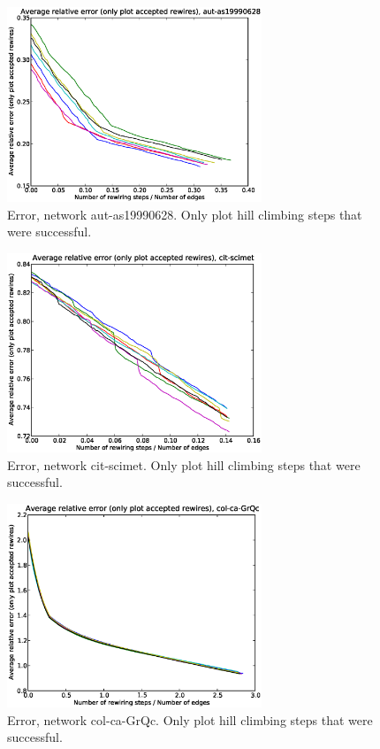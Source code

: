 \begin{figure}[p]
\centering
\includegraphics[width=3in]{Figures/acceptedOnly-aut-as19990628.eps}
\caption{Error, network aut-as19990628.  Only plot hill climbing steps that were successful.}
\label{fig:errors-aut-as19990628}
\end{figure}

\begin{figure}[p]
\centering
\includegraphics[width=3in]{Figures/acceptedOnly-cit-scimet.eps}
\caption{Error, network cit-scimet.  Only plot hill climbing steps that were successful.}
\label{fig:errors-cit-scimet}
\end{figure}

\begin{figure}[p]
\centering
\includegraphics[width=3in]{Figures/acceptedOnly-col-ca-GrQc.eps}
\caption{Error, network col-ca-GrQc.  Only plot hill climbing steps that were successful.}
\label{fig:errors-col-ca-GrQc}
\end{figure}

